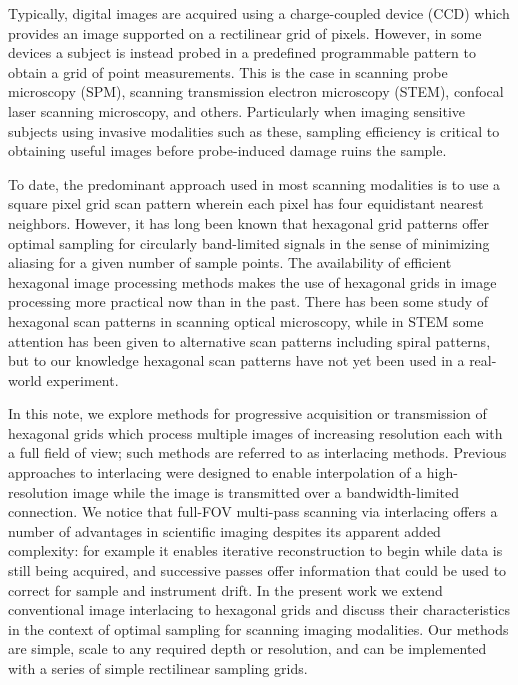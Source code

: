 \documentclass[aip, amsmath, amssymb, nobibnotes, nofootinbib, citeautoscript, reprint, superscriptaddress]{revtex4-1}
\begin{document}
    Typically, digital images are acquired using a charge-coupled device (CCD) which provides an image supported on a rectilinear grid of pixels.
    However, in some devices a subject is instead probed in a predefined programmable pattern to obtain a grid of point measurements.
    This is the case in scanning probe microscopy (SPM), scanning transmission electron microscopy (STEM), confocal laser scanning microscopy, and others.
    Particularly when imaging sensitive subjects using invasive modalities such as
    these, sampling efficiency is critical to obtaining useful images before probe-induced damage ruins the sample.


    To date, the predominant approach used in most scanning modalities is to use a square pixel grid scan pattern wherein each pixel has four equidistant nearest neighbors.
    However, it has long been known that hexagonal grid patterns offer optimal sampling for circularly band-limited signals in the sense of minimizing aliasing for a given number of sample points\cite{petersen1962}.
    The availability of efficient hexagonal image processing methods makes the use
    of hexagonal grids in image processing more practical now than in the past\cite{birdsong2016hexfft,middleton2006hexagonal}.
    There has been some study of hexagonal scan patterns in scanning optical
    microscopy\cite{heintzmann2007}, while in STEM some attention has been given to alternative scan patterns including spiral patterns\cite{sang2016dynamic}, but to our knowledge hexagonal scan patterns have not yet been used in a real-world experiment.


    In this note, we explore methods for progressive acquisition or transmission of hexagonal grids which process multiple images of increasing resolution each with a full field of view; such methods are referred to as interlacing methods.
    Previous approaches to interlacing were designed to enable interpolation of a
    high-resolution image while the image is transmitted over a bandwidth-limited connection.
    We notice that full-FOV multi-pass scanning via interlacing offers a number of
    advantages in scientific imaging despites its apparent added complexity: for
    example it enables iterative reconstruction to begin while data is still being
    acquired, and successive passes offer information that could be used to correct
    for sample and instrument drift.
    In the present work we extend conventional image interlacing to hexagonal grids and discuss their characteristics in the context of optimal sampling for scanning imaging modalities.
    Our methods are simple, scale to any required depth or resolution, and can be
    implemented with a series of simple rectilinear sampling grids.
\end{document}
